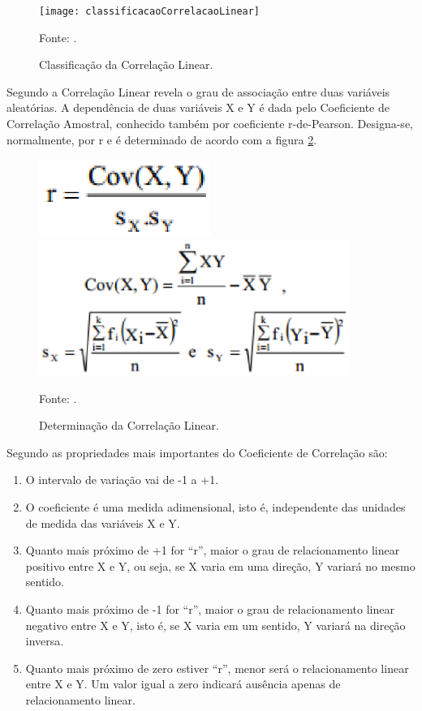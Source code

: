 \graphicspath{{figuras/}}
\begin{figure}[htp]
\centering
\texttt{[image: classificacaoCorrelacaoLinear]}
\caption{Classificação da Correlação Linear.}{Fonte: .} 
\label{classificacaoCorrelacaoLinear}
\end{figure}

Segundo  a Correlação Linear revela o grau de associação entre duas variáveis aleatórias. A dependência de duas variáveis X e Y é dada pelo Coeficiente de Correlação Amostral, conhecido também por coeficiente r-de-Pearson. Designa-se, normalmente, por r e é determinado de acordo com a figura \ref{determinacaoCorrelacao}.

\begin{figure}[htp]
\centering
\includegraphics[width=0.5\textwidth]{figuras/determinacaoCorrelacao1}
\includegraphics[width=0.9\textwidth]{figuras/determinacaoCorrelacao2}
\caption{Determinação da Correlação Linear.}{Fonte: .}
\label{determinacaoCorrelacao}
\end{figure}

Segundo  as propriedades mais importantes do Coeficiente de Correlação são:

\begin{enumerate}
\item O intervalo de variação vai de -1 a +1.
\item O coeficiente é uma medida adimensional, isto é, independente das unidades de medida das variáveis X e Y.
\item  Quanto mais próximo de +1 for “r”, maior o grau de relacionamento linear positivo entre X e Y, ou seja, se X varia em uma direção, Y variará no mesmo sentido.
\item Quanto mais próximo de -1 for “r”, maior o grau de relacionamento linear negativo entre X e Y, isto é, se X varia em um sentido, Y variará na direção inversa.
\item Quanto mais próximo de zero estiver “r”, menor será o relacionamento linear entre X e Y. Um valor igual a zero indicará ausência apenas de relacionamento linear.
\end{enumerate}

